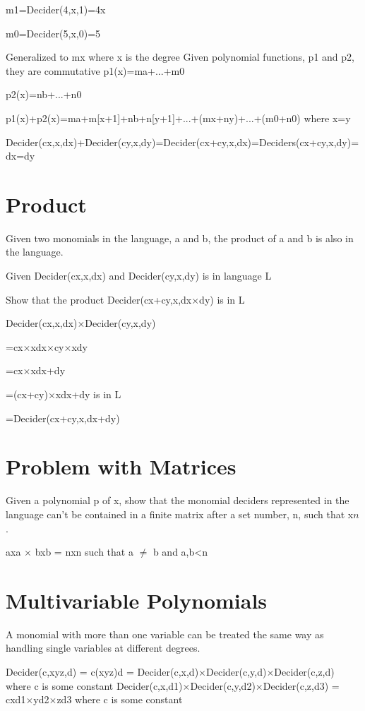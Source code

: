 m1=Decider(4,x,1)=4x

m0=Decider(5,x,0)=5


Generalized to mx where x is the degree
Given polynomial functions, p1 and p2, they are commutative
p1(x)=ma+...+m0

p2(x)=nb+...+n0


p1(x)+p2(x)=ma+m[x+1]+nb+n[y+1]+...+(mx+ny)+...+(m0+n0) where x=y

Decider(cx,x,dx)+Decider(cy,x,dy)=Decider(cx+cy,x,dx)=Deciders(cx+cy,x,dy)= dx=dy

\section{Product}

Given two monomials in the language, a and b, the product of a and b is also in the language.

Given Decider(cx,x,dx) and Decider(cy,x,dy) is in language L

Show that the product Decider(cx+cy,x,dx$\times $dy) is in L


Decider(cx,x,dx)$\times $Decider(cy,x,dy)

=cx$\times $xdx$\times $cy$\times $xdy

=cx$\times $xdx+dy

=(cx+cy)$\times $xdx+dy is in L

=Decider(cx+cy,x,dx+dy)

\section{Problem with Matrices}


Given a polynomial p of x, show that the monomial deciders represented in the language can't be contained in a finite matrix after a set number, n, such that x$n$.

axa $\times $ bxb = nxn such that a $\neq $ b and a,b<n

\section{Multivariable Polynomials}

A monomial with more than one variable can be treated the same way as handling single variables at different degrees.

Decider(c,xyz,d) = c(xyz)d = Decider(c,x,d)$\times $Decider(c,y,d)$\times $Decider(c,z,d) where c is some constant
Decider(c,x,d1)$\times $Decider(c,y,d2)$\times $Decider(c,z,d3) = cxd1$\times $yd2$\times $zd3 where c is some constant

